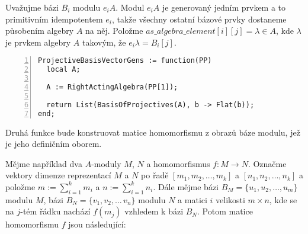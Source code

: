           Uvažujme bázi $B_i$ modulu $e_iA$. Modul $e_iA$ je 
          generovaný jedním prvkem a to primitivním idempotentem $e_i$, 
          takže všechny ostatní bázové prvky dostaneme 
          působením algebry $A$ na něj. Položme $as\_algebra\_element[i][j]=\lambda\in A$, 
          kde $\lambda$ je prvkem algebry $A$ takovým, že $e_i\lambda=B_i[j]$. \\
 
    \begin{Verbatim}[frame=single,numbers=left,numbers=left] 
ProjectiveBasisVectorGens := function(PP)
  local A;

  A := RightActingAlgebra(PP[1]);

  return List(BasisOfProjectives(A), b -> Flat(b));
end;
    \end{Verbatim}         
      
      Druhá funkce bude konstruovat matice homomorfismu z obrazů báze modulu, 
      jež je jeho definičním oborem. 
      
      Mějme například dva $A$-moduly $M$, $N$ a homomorfismus $f:M\to N$. 
       Označme vektory dimenze reprezentací $M$ a $N$ po řadě 
       $[m_1,m_2,\ldots,m_k]$ a $[n_1,n_2,\ldots,n_k]$ a položme $m:=\sum_{i=1}^k m_i$ 
       a  $n:=\sum_{i=1}^k n_i$. Dále mějme bázi $B_M=\{u_1,u_2,\ldots,u_m\}$ modulu $M$, 
       bázi $B_N=\{v_1,v_2,\ldots\,v_n\}$ modulu $N$ a matici $i$ velikosti $m\times n$, kde 
       se na $j$-tém řádku nachází $f(m_j)$ vzhledem k bázi $B_N$.
       Potom matice homomorfismu $f$ 
       jsou následující:\\\\


